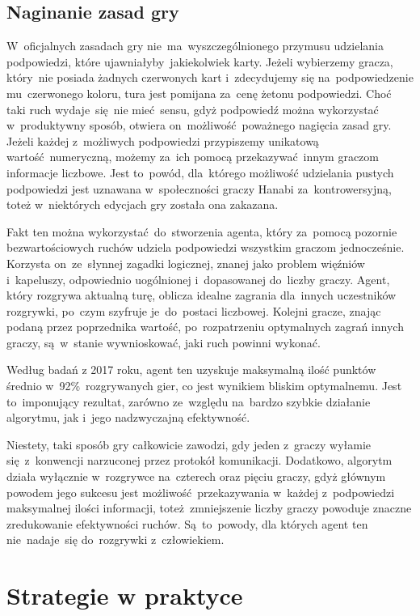 \documentclass[declaration,shortabstract,inz]{iithesis}
\begin{document}
\section{Naginanie zasad gry}

W~oficjalnych zasadach gry nie~ma~wyszczególnionego przymusu udzielania podpowiedzi, które ujawniałyby jakiekolwiek karty. Jeżeli wybierzemy gracza, który~nie posiada żadnych czerwonych kart i~zdecydujemy się na~podpowiedzenie mu~czerwonego koloru, tura jest pomijana za~cenę żetonu podpowiedzi. Choć taki ruch wydaje~się~nie mieć sensu, gdyż podpowiedź można wykorzystać w~produktywny sposób, otwiera on~możliwość poważnego nagięcia zasad gry. Jeżeli każdej z~możliwych podpowiedzi przypiszemy unikatową wartość numeryczną, możemy za~ich pomocą przekazywać innym graczom informacje liczbowe. Jest to~powód, dla~którego możliwość udzielania pustych podpowiedzi jest uznawana w~społeczności graczy Hanabi za~kontrowersyjną, toteż w~niektórych edycjach gry została ona zakazana.

Fakt ten można wykorzystać do~stworzenia agenta, który za~pomocą pozornie bezwartościowych ruchów udziela podpowiedzi wszystkim graczom jednocześnie. Korzysta on~ze~słynnej zagadki logicznej, znanej jako problem więźniów i~kapeluszy, odpowiednio uogólnionej i~dopasowanej do~liczby graczy. Agent, który rozgrywa aktualną turę, oblicza idealne zagrania dla~innych uczestników rozgrywki, po~czym szyfruje je~do~postaci liczbowej. Kolejni gracze, znając podaną przez poprzednika wartość, po~rozpatrzeniu optymalnych zagrań innych graczy, są~w~stanie wywnioskować, jaki ruch powinni wykonać.

Według badań z 2017 roku\cite{HatPlayer}, agent ten uzyskuje maksymalną ilość punktów średnio w~92\%~rozgrywanych gier, co jest wynikiem bliskim optymalnemu. Jest to~imponujący rezultat, zarówno ze~względu na~bardzo szybkie działanie algorytmu, jak i~jego nadzwyczajną efektywność.

Niestety, taki sposób gry całkowicie zawodzi, gdy jeden z~graczy wyłamie się z~konwencji narzuconej przez protokół komunikacji. Dodatkowo, algorytm działa wyłącznie w~rozgrywce na~czterech oraz pięciu graczy, gdyż głównym powodem jego sukcesu jest możliwość przekazywania w~każdej z~podpowiedzi maksymalnej ilości informacji, toteż~zmniejszenie liczby graczy powoduje znaczne zredukowanie efektywności ruchów. Są~to~powody, dla których agent ten nie~nadaje~się do~rozgrywki z~człowiekiem.

\chapter{Strategie w praktyce}
\end{document}
